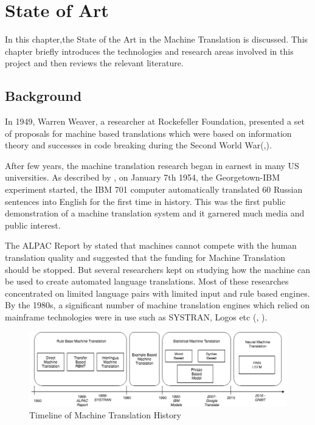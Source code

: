 \chapter{State of Art}
In this chapter,the State of the Art in the Machine Translation is discussed. This chapter briefly introduces the technologies and research areas involved in this project and then reviews the relevant literature.

\section{Background}
In 1949, Warren Weaver, a researcher at Rockefeller Foundation, presented a set of proposals for machine based translations which were based on information theory and successes in code breaking during the Second World War(\citeauthor{Weaver},\citeyear{Weaver}).

After few years, the machine translation research began in earnest in many US universities. As described by \cite{Hutchins55thegeorgetown-i.b.m.}, on January 7th 1954, the Georgetown-IBM experiment started, the IBM 701 computer automatically translated 60 Russian sentences into English for the first time in history. This was the first public demonstration of a machine translation system and it garnered much media and public interest.  
 
The ALPAC Report by \cite{Pierce:1966:LMC:1102009} stated that machines cannot compete with the human translation quality and suggested that the funding for Machine Translation should be stopped. But several researchers kept on studying how the machine can be used to create automated language translations. Most of these researches concentrated on limited language pairs with limited input and rule based engines. By the 1980s, a significant number of machine translation engines which relied on mainframe technologies were in use such as SYSTRAN, Logos etc (\citeauthor{wiki:history}, \citeyear{wiki:history}). 

\begin{figure}[h]
\includegraphics[width=\textwidth,]{figures/timeline.png}
\caption{Timeline of Machine Translation History} \label{sbmt}
\end{figure}

